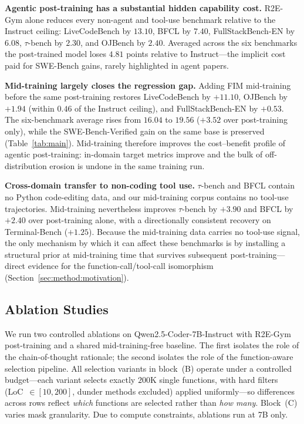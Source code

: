 \textbf{Agentic post-training has a substantial hidden capability cost.}
R2E-Gym alone reduces every non-agent and tool-use benchmark relative to
the Instruct ceiling: LiveCodeBench by $13.10$, BFCL by $7.40$,
FullStackBench-EN by $6.08$, $\tau$-bench by $2.30$, and OJBench by
$2.40$. Averaged across the six benchmarks the post-trained model loses
$4.81$ points relative to Instruct---the implicit cost paid for
SWE-Bench gains, rarely highlighted in agent papers.

\textbf{Mid-training largely closes the regression gap.}
Adding FIM mid-training before the same post-training restores
LiveCodeBench by $+11.10$, OJBench by $+1.94$ (within $0.46$ of the
Instruct ceiling), and FullStackBench-EN by $+0.53$. The six-benchmark
average rises from $16.04$ to $19.56$ ($+3.52$ over post-training only),
while the SWE-Bench-Verified gain on the same base is preserved
(Table~\ref{tab:main}). Mid-training therefore improves the
cost--benefit profile of agentic post-training: in-domain target
metrics improve and the bulk of off-distribution erosion is undone in
the same training run.

\textbf{Cross-domain transfer to non-coding tool use.}
$\tau$-bench and BFCL contain no Python code-editing data, and our
mid-training corpus contains no tool-use trajectories. Mid-training
nevertheless improves $\tau$-bench by $+3.90$ and BFCL by $+2.40$ over
post-training alone, with a directionally consistent recovery on
Terminal-Bench ($+1.25$). Because the mid-training data carries no
tool-use signal, the only mechanism by which it can affect these
benchmarks is by installing a structural prior at mid-training time
that survives subsequent post-training---direct evidence for the
function-call/tool-call isomorphism (Section~\ref{sec:method:motivation}).

\vspace{-0.5ex}
\subsection{Ablation Studies}
\label{sec:exp:ablation}

We run two controlled ablations on Qwen2.5-Coder-7B-Instruct with R2E-Gym
post-training and a shared mid-training-free baseline. The first
isolates the role of the chain-of-thought rationale; the second isolates
the role of the function-aware selection pipeline. All selection
variants in block~(B) operate under a controlled budget---each variant
selects exactly $200$K single functions, with hard filters
(LoC~$\in[10,200]$, dunder methods excluded) applied uniformly---so
differences across rows reflect \emph{which} functions are selected
rather than \emph{how many}. Block~(C) varies mask granularity. Due to
compute constraints, ablations run at 7B only.

